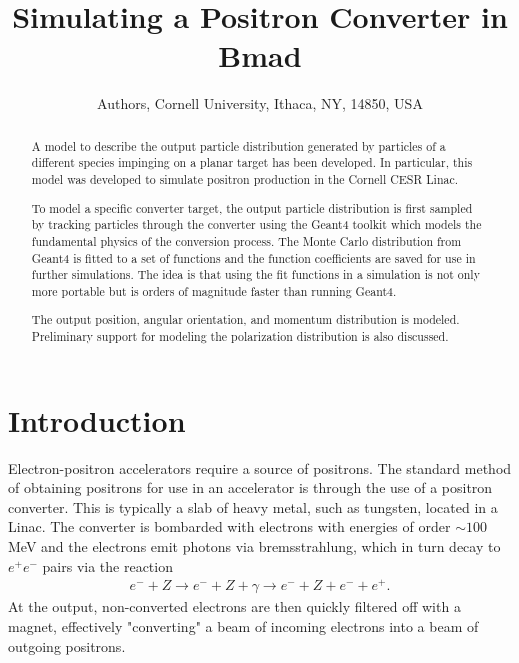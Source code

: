 \documentclass[letter,
               biblatex,     %
               keeplastbox,   %
               ]{jacow}
\begin{document}
\title{Simulating a Positron Converter in Bmad}

\author{Authors, Cornell University, Ithaca, NY, 14850, USA}

\maketitle

\begin{abstract}
A model to describe the output particle distribution generated by particles of a different species
impinging on a planar target has been developed. In particular, this model was developed to simulate
positron production in the Cornell CESR Linac.

To model a specific converter target, the output particle distribution is first sampled by tracking
particles through the converter using the Geant4 toolkit which models the fundamental physics of the
conversion process. The Monte Carlo distribution from Geant4 is fitted to a set of functions and the
function coefficients are saved for use in further simulations. The idea is that using the fit
functions in a simulation is not only more portable but is orders of magnitude faster than running
Geant4.

The output position, angular orientation, and momentum distribution is modeled. Preliminary support
for modeling the polarization distribution is also discussed.
\end{abstract}

\section{Introduction}


Electron-positron accelerators require a source of positrons.
The standard method of obtaining positrons for use in an accelerator is through the use of a positron converter.
This is typically a slab of heavy metal, such as tungsten, located in a Linac.
The converter is bombarded with electrons with energies of order $\sim 100$ MeV and
the electrons emit photons via bremsstrahlung, which in turn decay to $e^+ e^-$ pairs via the reaction
\begin{align*}
e^- + Z \rightarrow e^- + Z + \gamma \rightarrow e^- + Z + e^- + e^+.
\end{align*}
At the output, non-converted electrons are then quickly filtered off with a %
magnet, effectively "converting" a beam of incoming electrons into a beam of outgoing positrons.
\end{document}

